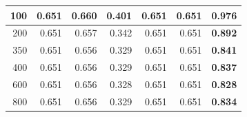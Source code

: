 \documentclass[letterpaper, 10 pt, conference]{ieeeconf}
\begin{document}
\begin{figure}[!t]
\begin{minipage}{\columnwidth}
{\begin{tabular}{|rrrrrrr|}
\multicolumn{1}{|r|}{100} & \multicolumn{1}{r|}{0.651} & \multicolumn{1}{r|}{0.660} & \multicolumn{1}{r|}{0.401} & \multicolumn{1}{r|}{0.651} & \multicolumn{1}{r|}{0.651} & \textbf{0.976} \\ \hline
\multicolumn{1}{|r|}{200} & \multicolumn{1}{r|}{0.651} & \multicolumn{1}{r|}{0.657} & \multicolumn{1}{r|}{0.342} & \multicolumn{1}{r|}{0.651} & \multicolumn{1}{r|}{0.651} & \textbf{0.892} \\ \hline
\multicolumn{1}{|r|}{350} & \multicolumn{1}{r|}{0.651} & \multicolumn{1}{r|}{0.656} & \multicolumn{1}{r|}{0.329} & \multicolumn{1}{r|}{0.651} & \multicolumn{1}{r|}{0.651} & \textbf{0.841} \\ \hline
\multicolumn{1}{|r|}{400} & \multicolumn{1}{r|}{0.651} & \multicolumn{1}{r|}{0.656} & \multicolumn{1}{r|}{0.329} & \multicolumn{1}{r|}{0.651} & \multicolumn{1}{r|}{0.651} & \textbf{0.837} \\ \hline
\multicolumn{1}{|r|}{600} & \multicolumn{1}{r|}{0.651} & \multicolumn{1}{r|}{0.656} & \multicolumn{1}{r|}{0.328} & \multicolumn{1}{r|}{0.651} & \multicolumn{1}{r|}{0.651} & \textbf{0.828} \\ \hline
\multicolumn{1}{|r|}{800} & \multicolumn{1}{r|}{0.651} & \multicolumn{1}{r|}{0.656} & \multicolumn{1}{r|}{0.329} & \multicolumn{1}{r|}{0.651} & \multicolumn{1}{r|}{0.651} & \textbf{0.834} \\ \hline\hline

\end{tabular}}
\end{minipage}
\end{figure}
\end{document}
